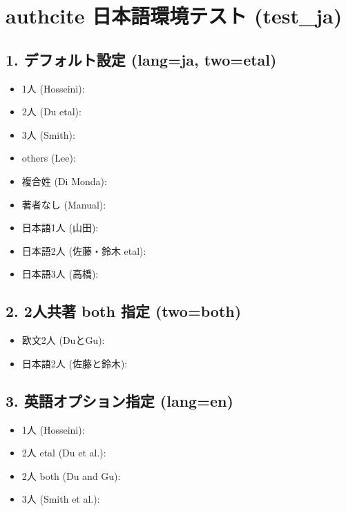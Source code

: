 \documentclass[uplatex]{jsarticle}
\begin{document}
\section*{authcite 日本語環境テスト (test\_ja)}

\subsection*{1. デフォルト設定 (lang=ja, two=etal)}
\begin{itemize}
  \item 1人 (Hosseini): 
  \item 2人 (Du etal): 
  \item 3人 (Smith): 
  \item others (Lee): 
  \item 複合姓 (Di Monda): 
  \item 著者なし (Manual): 
  \item 日本語1人 (山田): 
  \item 日本語2人 (佐藤・鈴木 etal): 
  \item 日本語3人 (高橋): 
\end{itemize}

\subsection*{2. 2人共著 both 指定 (two=both)}
\begin{itemize}
  \item 欧文2人 (DuとGu): 
  \item 日本語2人 (佐藤と鈴木): 
\end{itemize}

\subsection*{3. 英語オプション指定 (lang=en)}
\begin{itemize}
  \item 1人 (Hosseini): 
  \item 2人 etal (Du et al.): 
  \item 2人 both (Du and Gu): 
  \item 3人 (Smith et al.): 
\end{itemize}



\end{document}

